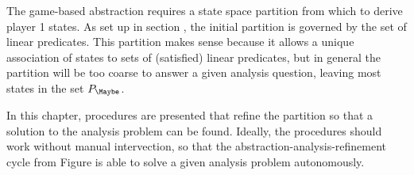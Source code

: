 The game-based abstraction requires a state space partition from which to derive player 1 states.
As set up in section , the initial partition is governed by the set of linear predicates.
This partition makes sense because it allows a unique association of states to sets of (satisfied) linear predicates, but in general the partition will be too coarse to answer a given analysis question, leaving most states in the set $P_\Maybe$.

In this chapter, procedures are presented that refine the partition so that a solution to the analysis problem can be found.
Ideally, the procedures should work without manual intervection, so that the abstraction-analysis-refinement cycle from Figure  is able to solve a given analysis problem autonomously.

